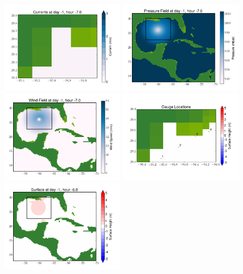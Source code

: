 \documentclass[11pt]{article}
\begin{document}
\vskip 10pt 
\includegraphics[width=0.475\textwidth]{frame0041fig7.png}
\includegraphics[width=0.475\textwidth]{frame0041fig8.png}
\vskip 10pt 
\includegraphics[width=0.475\textwidth]{frame0041fig9.png}
\includegraphics[width=0.475\textwidth]{frame0041fig10.png}
\vskip 10pt 
\includegraphics[width=0.475\textwidth]{frame0042fig1.png}
\end{document}
